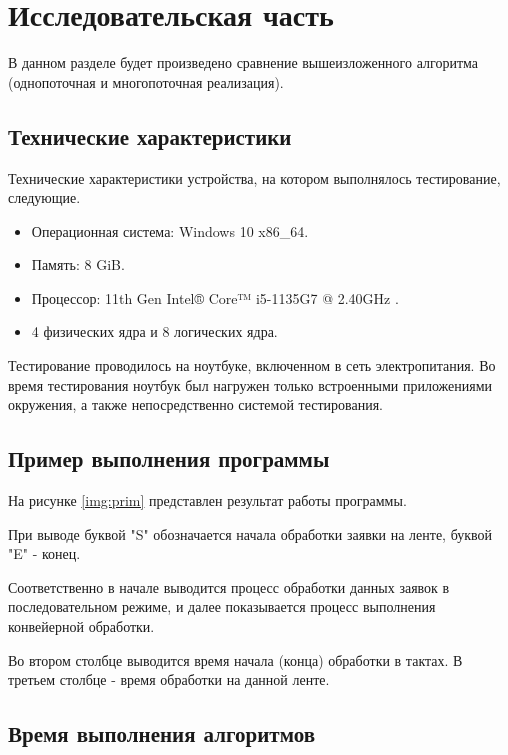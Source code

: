 \chapter{Исследовательская часть}
В данном разделе будет произведено сравнение вышеизложенного алгоритма (однопоточная и многопоточная реализация).

\section{Технические характеристики}

Технические характеристики устройства, на котором выполнялось тестирование, следующие.

\begin{itemize}
	\item Операционная система: Windows 10 \cite{oswind} x86\_64.
	\item Память: 8 GiB.
	\item Процессор: 11th Gen Intel® Core™ i5-1135G7 @ 2.40GHz \cite{intel}.
	\item 4 физических ядра и 8 логических ядра.
\end{itemize}

Тестирование проводилось на ноутбуке, включенном в сеть электропитания. Во время тестирования ноутбук был нагружен только встроенными приложениями окружения, а также непосредственно системой тестирования.

\section{Пример выполнения программы}
На рисунке \ref{img:prim} представлен результат работы программы.

При выводе буквой "S" обозначается начала обработки заявки на ленте, буквой "E" - конец.

Соответственно в начале выводится процесс обработки данных заявок в последовательном режиме, и далее показывается процесс выполнения конвейерной обработки.

Во втором столбце выводится время начала (конца) обработки в тактах. В третьем столбце - время обработки на данной ленте.

\clearpage

\section{Время выполнения алгоритмов}

